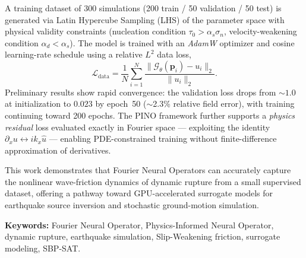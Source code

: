 \documentclass[12pt]{article}
\begin{document}
A training dataset of 300 simulations (200 train / 50 validation / 50 test)
is generated via Latin Hypercube Sampling (LHS) of the parameter space with
physical validity constraints (nucleation condition $\tau_0 > \alpha_s\sigma_n$,
velocity-weakening condition $\alpha_d < \alpha_s$).
The model is trained with an \emph{AdamW} optimizer and cosine learning-rate
schedule using a relative $L^2$ data loss,
\begin{equation}
  \mathcal{L}_{\text{data}}
  = \frac{1}{N}\sum_{i=1}^{N}
    \frac{\|\mathcal{G}_\theta(\mathbf{p}_i) - u_i\|_2}{\|u_i\|_2}.
\end{equation}
Preliminary results show rapid convergence: the validation loss drops from
$\sim\!1.0$ at initialization to $\mathbf{0.023}$ by epoch~50
($\sim$2.3\% relative field error), with training continuing toward
200 epochs.
The PINO framework further supports a \emph{physics residual} loss
evaluated exactly in Fourier space — exploiting the identity
$\partial_x u \leftrightarrow ik_x\hat{u}$ — enabling PDE-constrained
training without finite-difference approximation of derivatives.

This work demonstrates that Fourier Neural Operators can accurately capture
the nonlinear wave-friction dynamics of dynamic rupture from a small
supervised dataset, offering a pathway toward GPU-accelerated surrogate
models for earthquake source inversion and stochastic ground-motion
simulation.

\vspace{10pt}
\noindent
\textbf{Keywords:} Fourier Neural Operator, Physics-Informed Neural Operator,
dynamic rupture, earthquake simulation, Slip-Weakening friction,
surrogate modeling, SBP-SAT.
\end{document}

